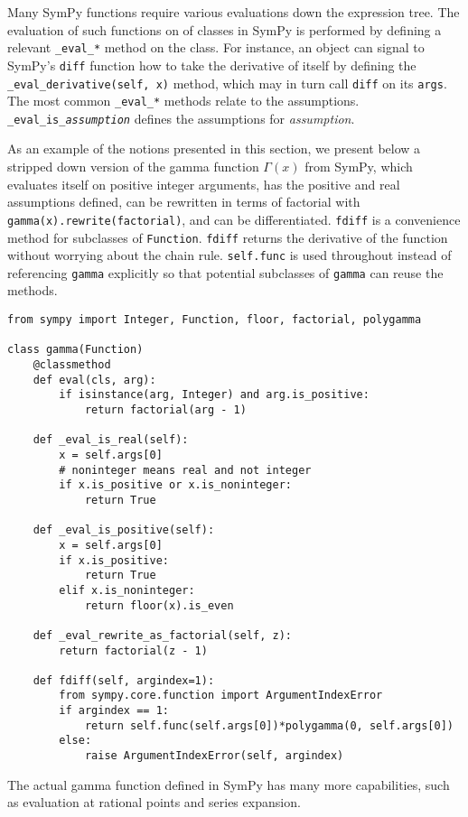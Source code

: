 Many SymPy functions require various evaluations down the expression tree.  The
evaluation of such functions on of classes in SymPy is performed by defining a
relevant \verb|_eval_|\texttt{\textit{*}} method on the class. For instance, an
object can signal to SymPy's \texttt{diff} function how to take the derivative of
itself by defining the \verb|_eval_derivative(self, x)| method, which may in
turn call \texttt{diff} on its \texttt{args}. The most common
\verb|_eval_|\texttt{\textit{*}} methods relate to the assumptions.
\verb|_eval_is_|\texttt{\textit{assumption}} defines the assumptions for
\textit{assumption}.

As an example of the notions presented in this section, we present below
a stripped down version of the gamma function $\Gamma(x)$ from SymPy,
which evaluates itself on positive integer arguments, has the positive and
real assumptions defined, can be rewritten in terms of factorial with
\verb|gamma(x).rewrite(factorial)|, and can be differentiated.
\texttt{fdiff} is a convenience method for subclasses of \texttt{Function}.
\texttt{fdiff} returns the derivative of the function without worrying about
the chain rule. \texttt{self.func} is used throughout instead of referencing
\texttt{gamma} explicitly so that potential subclasses of \texttt{gamma} can
reuse the methods.
\begin{verbatim}
from sympy import Integer, Function, floor, factorial, polygamma

class gamma(Function)
    @classmethod
    def eval(cls, arg):
        if isinstance(arg, Integer) and arg.is_positive:
            return factorial(arg - 1)

    def _eval_is_real(self):
        x = self.args[0]
        # noninteger means real and not integer
        if x.is_positive or x.is_noninteger:
            return True

    def _eval_is_positive(self):
        x = self.args[0]
        if x.is_positive:
            return True
        elif x.is_noninteger:
            return floor(x).is_even

    def _eval_rewrite_as_factorial(self, z):
        return factorial(z - 1)

    def fdiff(self, argindex=1):
        from sympy.core.function import ArgumentIndexError
        if argindex == 1:
            return self.func(self.args[0])*polygamma(0, self.args[0])
        else:
            raise ArgumentIndexError(self, argindex)
\end{verbatim}
The actual gamma function defined in SymPy has many more capabilities, such as
evaluation at rational points and series expansion.
